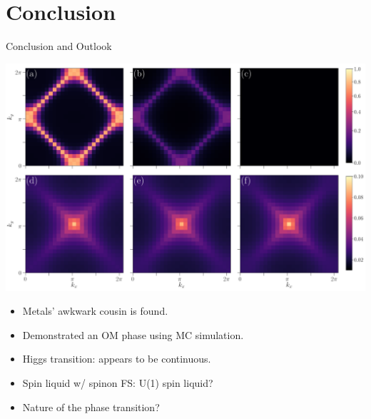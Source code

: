 \documentclass[xcolor=table, 10pt, aspectratio=43]{beamer}
\begin{document}
\section{Conclusion}
\begin{frame}{Conclusion and Outlook}
\begin{center}
	\includegraphics[width=.6\textwidth]{fig2}
\end{center}
\begin{itemize}
\item Metals' awkwark cousin is found.
\item Demonstrated an OM phase using MC simulation.
\item Higgs transition: appears to be continuous.
\item Spin liquid w/ spinon FS: U(1) spin liquid?
\item Nature of the phase transition?
\end{itemize}
\end{frame}
\end{document}
